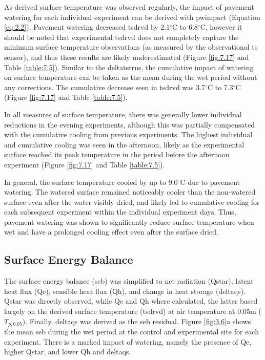 \documentclass[final,3p,times,authoryear]{elsarticle}
\begin{document}
As derived surface temperature was observed regularly, the impact of pavement watering for each individual experiment can be derived with \gls{pwimpact} (Equation \ref{eq:2.2}). Pavement watering decreased \gls{tsdrvd} by 2.1$^{\circ}$C to 6.8$^{\circ}$C, however it should be noted that experimental \gls{tsdrvd} does not completely capture the minimum surface temperature observations (as measured by the observational \gls{ts} sensor), and thus these results are likely underestimated (Figure \ref{fig:7.17} and Table \ref{table:7.5}). Similar to the \gls{deltatstrns}, the cumulative impact of watering on surface temperature can be taken as the mean during the wet period without any corrections. The cumulative decrease seen in \gls{tsdrvd} was 3.7$^{\circ}$C to 7.3$^{\circ}$C (Figure \ref{fig:7.17} and Table \ref{table:7.5}).

In all measures of surface temperature, there was generally lower individual reductions in the evening experiments, although this was partially compensated with the cumulative cooling from previous experiments. The highest individual and cumulative cooling was seen in the afternoon, likely as the experimental surface reached its peak temperature in the period before the afternoon experiment (Figure \ref{fig:7.17} and Table \ref{table:7.5}).

In general, the surface temperature cooled by up to 9.0$^{\circ}$C due to pavement watering. The watered surface remained noticeably cooler than the non-watered surface even after the water visibly dried, and likely led to cumulative cooling for each subsequent experiment within the individual experiment days. Thus, pavement watering was shown to significantly reduce surface temperature when wet and have a prolonged cooling effect even after the surface dried.

\subsection{Surface Energy Balance}\label{sec:discussion3.4}

The surface energy balance (\gls{seb}) was simplified to net radiation (\gls{Qstar}), latent heat flux (\gls{Qe}), sensible heat flux (\gls{Qh}), and change in heat storage (\gls{deltaqs}). \gls{Qstar} was directly observed, while \gls{Qe} and \gls{Qh} where calculated, the latter based largely on the derived surface temperature (\gls{tsdrvd}) at air temperature at 0.05m ($T_{p,0.05}$). Finally, \gls{deltaqs} was derived as the \gls{seb} residual. Figure \ref{fig:3.6}a shows the mean \gls{seb} during the wet period at the control and experimental site for each experiment. There is a marked impact of watering, namely the presence of \gls{Qe}, higher \gls{Qstar}, and lower \gls{Qh} and \gls{deltaqs}.
\end{document}

